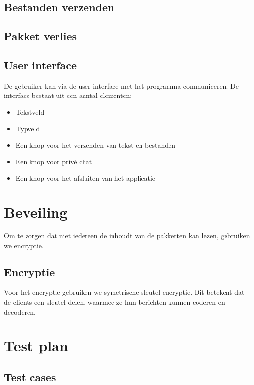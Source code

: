 \documentclass{article}
\begin{document}
\subsection{Bestanden verzenden}

\subsection{Pakket verlies}

\subsection{User interface}
De gebruiker kan via de user interface met het programma communiceren. De interface bestaat uit een aantal elementen:
\begin{itemize}
\item Tekstveld
\item Typveld
\item Een knop voor het verzenden van tekst en bestanden
\item Een knop voor privé chat
\item Een knop voor het afsluiten van het applicatie
\end{itemize}

\section{Beveiling}
Om te zorgen dat niet iedereen de inhoudt van de pakketten kan lezen, gebruiken we encryptie. 

\subsection{Encryptie}
Voor het encryptie gebruiken we symetrische sleutel encryptie. Dit betekent dat de clients een sleutel delen, waarmee ze hun berichten kunnen coderen en decoderen.  

\section{Test plan}


\subsection{Test cases}
\end{document}
